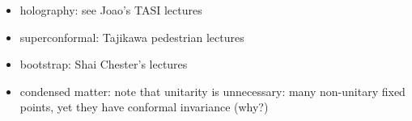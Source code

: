 \documentclass[a4paper,12pt]{article}
\numberwithin{equation}{section}
\begin{document}
\begin{itemize}

\item
holography: see Joao's TASI lectures

\item
superconformal: Tajikawa pedestrian lectures

\item
bootstrap: Shai Chester's lectures

\item
condensed matter:
note that unitarity is unnecessary: many non-unitary fixed points, yet they have conformal invariance (why?)

\end{itemize}



%
%
\end{document}
